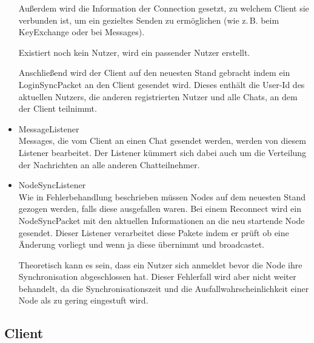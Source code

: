 \begin{itemize}
        Außerdem wird die Information der Connection gesetzt, zu welchem Client sie verbunden ist, um ein gezieltes Senden zu ermöglichen (wie z.\,B. beim KeyExchange oder bei Messages).
        
        Existiert noch kein Nutzer, wird ein passender Nutzer erstellt.
        
        Anschließend wird der Client auf den neuesten Stand gebracht indem ein LoginSyncPacket an den Client gesendet wird. Dieses enthält die User-Id des aktuellen Nutzers, die anderen registrierten Nutzer und alle Chats, an dem der Client teilnimmt.
        
    \item MessageListener\\
        Messages, die vom Client an einen Chat gesendet werden, werden von diesem Listener bearbeitet. Der Listener kümmert sich dabei auch um die Verteilung der Nachrichten an alle anderen Chatteilnehmer.
        
    \item NodeSyncListener\\
        Wie in Fehlerbehandlung beschrieben müssen Nodes auf dem neuesten Stand gezogen werden, falls diese ausgefallen waren. Bei einem Reconnect wird ein NodeSyncPacket mit den aktuellen Informationen an die neu startende Node gesendet. Dieser Listener verarbeitet diese Pakete indem er prüft ob eine Änderung vorliegt und wenn ja diese übernimmt und broadcastet. 
        
        Theoretisch kann es sein, dass ein Nutzer sich anmeldet bevor die Node ihre Synchronisation abgeschlossen hat. Dieser Fehlerfall wird aber nicht weiter behandelt, da die Synchronisationszeit und die Ausfallwahrscheinlichkeit einer Node als zu gering eingestuft wird.
\end{itemize}

\subsection{Client}
